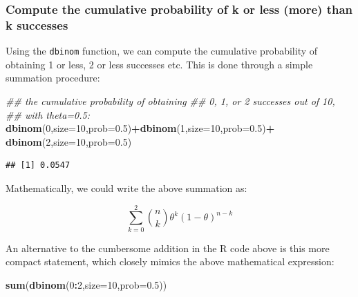 \documentclass[12pt,]{krantz}
\newenvironment{Shaded}{\begin{snugshade}}{\end{snugshade}}
\newcommand{\CommentTok}[1]{\textcolor[rgb]{0.56,0.35,0.01}{\textit{#1}}}
\newcommand{\DataTypeTok}[1]{\textcolor[rgb]{0.13,0.29,0.53}{#1}}
\newcommand{\DecValTok}[1]{\textcolor[rgb]{0.00,0.00,0.81}{#1}}
\newcommand{\FloatTok}[1]{\textcolor[rgb]{0.00,0.00,0.81}{#1}}
\newcommand{\KeywordTok}[1]{\textcolor[rgb]{0.13,0.29,0.53}{\textbf{#1}}}
\newcommand{\NormalTok}[1]{#1}
\newcommand{\OperatorTok}[1]{\textcolor[rgb]{0.81,0.36,0.00}{\textbf{#1}}}
\newcommand{\StringTok}[1]{\textcolor[rgb]{0.31,0.60,0.02}{#1}}
\theoremstyle{definition}
\theoremstyle{definition}
\theoremstyle{definition}
\theoremstyle{remark}
\begin{document}
\hypertarget{compute-the-cumulative-probability-of-k-or-less-more-than-k-successes}{%
\subsubsection{Compute the cumulative probability of k or less (more) than k successes}\label{compute-the-cumulative-probability-of-k-or-less-more-than-k-successes}}

Using the \texttt{dbinom} function, we can compute the cumulative probability of obtaining 1 or less, 2 or less successes etc. This is done through a simple summation procedure:

\begin{Shaded}
\begin{Highlighting}[]
\CommentTok{## the cumulative probability of obtaining}
\CommentTok{## 0, 1, or 2 successes out of 10,}
\CommentTok{## with theta=0.5:}
\KeywordTok{dbinom}\NormalTok{(}\DecValTok{0}\NormalTok{,}\DataTypeTok{size=}\DecValTok{10}\NormalTok{,}\DataTypeTok{prob=}\FloatTok{0.5}\NormalTok{)}\OperatorTok{+}\KeywordTok{dbinom}\NormalTok{(}\DecValTok{1}\NormalTok{,}\DataTypeTok{size=}\DecValTok{10}\NormalTok{,}\DataTypeTok{prob=}\FloatTok{0.5}\NormalTok{)}\OperatorTok{+}
\StringTok{  }\KeywordTok{dbinom}\NormalTok{(}\DecValTok{2}\NormalTok{,}\DataTypeTok{size=}\DecValTok{10}\NormalTok{,}\DataTypeTok{prob=}\FloatTok{0.5}\NormalTok{)}
\end{Highlighting}
\end{Shaded}

\begin{verbatim}
## [1] 0.0547
\end{verbatim}

Mathematically, we could write the above summation as:

\begin{equation}
\sum_{k=0}^2 \binom{n}{k} \theta^{k} (1-\theta)^{n-k} 
\end{equation}

An alternative to the cumbersome addition in the R code above is this more compact statement, which closely mimics the above mathematical expression:

\begin{Shaded}
\begin{Highlighting}[]
\KeywordTok{sum}\NormalTok{(}\KeywordTok{dbinom}\NormalTok{(}\DecValTok{0}\OperatorTok{:}\DecValTok{2}\NormalTok{,}\DataTypeTok{size=}\DecValTok{10}\NormalTok{,}\DataTypeTok{prob=}\FloatTok{0.5}\NormalTok{))}
\end{Highlighting}
\end{Shaded}
\end{document}
